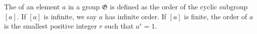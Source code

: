 The  of an element $a$ in a group $\mathfrak{G}$ is defined as the order of the cyclic subgroup $[a]$. If $[a]$ is infinite, we say $a$ has infinite order. If $[a]$ is finite, the order of $a$ is the smallest positive integer $r$ such that $a^r = 1$.
